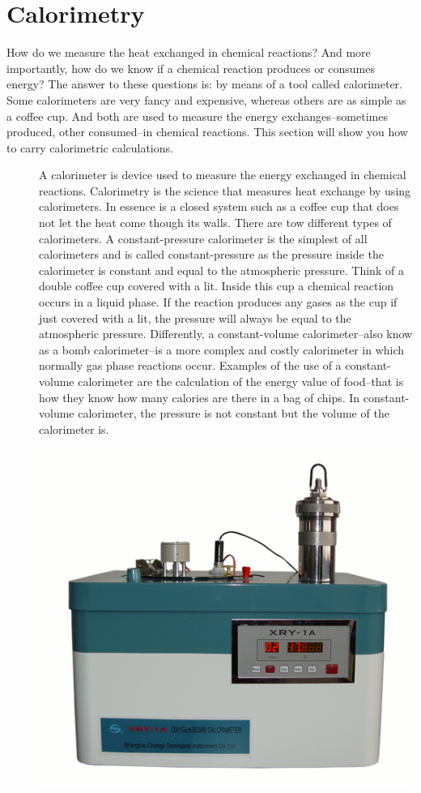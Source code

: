 \documentclass[main.tex]{subfiles}
\begin{document}
\section{Calorimetry}
How do we measure the heat exchanged in chemical reactions? And more importantly, how do we know if a chemical reaction produces or consumes energy? The answer to these questions is: by means of a tool called calorimeter. Some calorimeters are very fancy and expensive, whereas others are as simple as a coffee cup. And both are used to measure the energy exchanges--sometimes produced, other consumed--in chemical reactions. This section will show you how to carry calorimetric calculations. 
\sloppy
\begin{description}
\item[] 
A calorimeter is device used to measure the energy exchanged in chemical reactions. Calorimetry is the science that measures heat exchange by using calorimeters. In essence is a closed system such as a coffee cup that does not let the heat come though its walls. There are tow different types of calorimeters. A constant-pressure calorimeter is the simplest of all calorimeters and is called constant-pressure as the pressure inside the calorimeter is constant and equal to the atmospheric pressure. Think of a double coffee cup covered with a lit. Inside this cup a chemical reaction occurs in a liquid phase. If the reaction produces any gases as the cup if just covered with a lit, the pressure will always be equal to the atmospheric pressure. Differently, a constant-volume calorimeter--also know as a bomb calorimeter--is a more complex and costly calorimeter in which normally gas phase reactions occur. Examples of the use of a constant-volume calorimeter are the calculation of the energy value of food--that is how they know how many calories are there in a bag of chips. In constant-volume calorimeter, the pressure is not constant but the volume of the calorimeter is.
   \begin{marginfigure}[-4cm]
      \includegraphics{chapter2/figure1-6}

\end{marginfigure}
\end{description}
\end{document}
